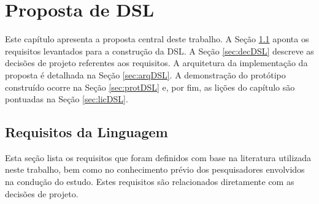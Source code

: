 \chapter{Proposta de DSL}\label{propostaDSL}

Este capítulo apresenta a proposta central deste trabalho. 
A Seção \ref{sec:reqDSL} aponta os requisitos levantados para a construção da \ac{DSL}. 
A Seção \ref{sec:decDSL} descreve as decisões de projeto referentes aos requisitos. 
A arquitetura da implementação da proposta é detalhada na Seção \ref{sec:arqDSL}. 
A demonstração do protótipo construído ocorre na Seção \ref{sec:protDSL} e, por fim, as lições do capítulo são pontuadas na Seção \ref{sec:licDSL}.

\section{Requisitos da Linguagem} \label{sec:reqDSL}

Esta seção lista os requisitos que foram definidos com base na literatura utilizada neste trabalho, bem como no conhecimento prévio dos pesquisadores envolvidos na condução do estudo. 
Estes requisitos são relacionados diretamente com as decisões de projeto.

